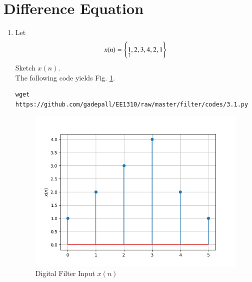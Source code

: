 \documentclass[journal,12pt,twocolumn]{IEEEtran}
\theoremstyle{remark}
\renewcommand\thesection{\arabic{section}}
\numberwithin{equation}{subsection}
\begin{document}
\section{Difference Equation}
\begin{enumerate}[label=\thesection.\arabic*,ref=\thesection.\theenumi]
\item Let
\begin{equation}
x(n) = \left\{\underset{\uparrow}{1},2,3,4,2,1\right\}
\end{equation}
Sketch $x(n)$.\\

\solution The following code yields Fig. \ref{fig:x_n}.
\begin{lstlisting}
wget https://github.com/gadepall/EE1310/raw/master/filter/codes/3.1.py
\end{lstlisting}
\begin{figure}[!h]
    \centering
    \includegraphics[width = \columnwidth]{figs/3.1.png}
    \caption{Digital Filter Input $x(n)$}
    \label{fig:x_n}
\end{figure}


\end{enumerate}
\end{document}
